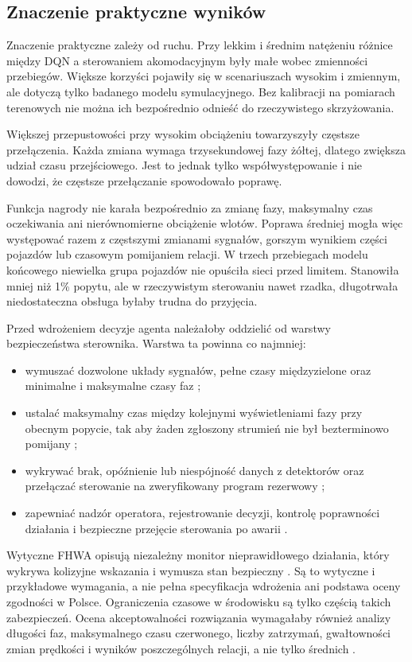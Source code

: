 \subsection{Znaczenie praktyczne wyników}
\label{subsec:znaczenie-praktyczne}

Znaczenie praktyczne zależy od ruchu. Przy lekkim i średnim natężeniu różnice między DQN a sterowaniem akomodacyjnym były małe wobec zmienności przebiegów. Większe korzyści pojawiły się w scenariuszach wysokim i zmiennym, ale dotyczą tylko badanego modelu symulacyjnego. Bez kalibracji na pomiarach terenowych nie można ich bezpośrednio odnieść do rzeczywistego skrzyżowania.

Większej przepustowości przy wysokim obciążeniu towarzyszyły częstsze przełączenia. Każda zmiana wymaga trzysekundowej fazy żółtej, dlatego zwiększa udział czasu przejściowego. Jest to jednak tylko współwystępowanie i nie dowodzi, że częstsze przełączanie spowodowało poprawę.

Funkcja nagrody nie karała bezpośrednio za zmianę fazy, maksymalny czas oczekiwania ani nierównomierne obciążenie wlotów. Poprawa średniej mogła więc występować razem z częstszymi zmianami sygnałów, gorszym wynikiem części pojazdów lub czasowym pomijaniem relacji. W trzech przebiegach modelu końcowego niewielka grupa pojazdów nie opuściła sieci przed limitem. Stanowiła mniej niż 1\% popytu, ale w rzeczywistym sterowaniu nawet rzadka, długotrwała niedostateczna obsługa byłaby trudna do przyjęcia.

Przed wdrożeniem decyzje agenta należałoby oddzielić od warstwy bezpieczeństwa sterownika. Warstwa ta powinna co najmniej:
\begin{itemize}
    \item wymuszać dozwolone układy sygnałów, pełne czasy międzyzielone oraz minimalne i maksymalne czasy faz \cite{NAP22097,brummond2018central_signal_systems};
    \item ustalać maksymalny czas między kolejnymi wyświetleniami fazy przy obecnym popycie, tak aby żaden zgłoszony strumień nie był bezterminowo pomijany \cite{brummond2018central_signal_systems};
    \item wykrywać brak, opóźnienie lub niespójność danych z detektorów oraz przełączać sterowanie na zweryfikowany program rezerwowy \cite{brummond2018central_signal_systems};
    \item zapewniać nadzór operatora, rejestrowanie decyzji, kontrolę poprawności działania i bezpieczne przejęcie sterowania po awarii \cite{brummond2018central_signal_systems}.
\end{itemize}
Wytyczne FHWA opisują niezależny monitor nieprawidłowego działania, który wykrywa kolizyjne wskazania i wymusza stan bezpieczny \cite{fhwa2023traffic_signal_handbook}. Są to wytyczne i przykładowe wymagania, a nie pełna specyfikacja wdrożenia ani podstawa oceny zgodności w Polsce. Ograniczenia czasowe w środowisku są tylko częścią takich zabezpieczeń. Ocena akceptowalności rozwiązania wymagałaby również analizy długości faz, maksymalnego czasu czerwonego, liczby zatrzymań, gwałtowności zmian prędkości i wyników poszczególnych relacji, a nie tylko średnich \cite{NAP22097}.

